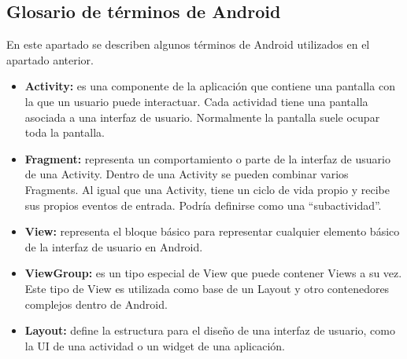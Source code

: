 \subsection{Glosario de términos de Android}
En este apartado se describen algunos términos de Android utilizados en el apartado anterior.
\begin{itemize}
	\item \textbf{Activity:} es una componente de la aplicación que contiene una pantalla con la que un usuario puede interactuar. Cada actividad tiene una pantalla asociada a una interfaz de usuario. Normalmente la pantalla suele ocupar toda la pantalla.
	\item \textbf{Fragment:} representa un comportamiento o parte de la interfaz de usuario de una Activity. Dentro de una Activity se pueden combinar varios Fragments. Al igual que una Activity, tiene un ciclo de vida propio y recibe sus propios eventos de entrada. Podría definirse como una \enquote{subactividad}.
	\item \textbf{View:} representa el bloque básico para representar cualquier elemento básico de la interfaz de usuario en Android.
	\item \textbf{ViewGroup:} es un tipo especial de View que puede contener Views a su vez. Este tipo de View es utilizada como base de un Layout y otro contenedores complejos dentro de Android.
	\item \textbf{Layout:} define la estructura para el diseño de una interfaz de usuario, como la UI de una actividad o un widget de una aplicación.
\end{itemize}

